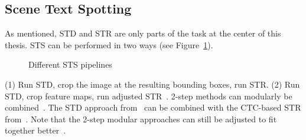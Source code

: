 \subsection{Scene Text Spotting}
As mentioned, \ac{STD} and \ac{STR} are only parts of the task at the center of this thesis.
\ac{STS} can be performed in two ways (see Figure~\ref{fig:e2e-pipelines}).

\begin{figure}[ht]
    \centering
    
    \caption{Different STS pipelines\label{fig:e2e-pipelines}}
\end{figure}
(1) Run \ac{STD}, crop the image at the resulting bounding boxes, run \ac{STR}.
(2) Run \ac{STD}, crop feature maps, run adjusted \ac{STR}~\citep{chen_text_2021,long_scene_2021}.
2-step methods can modularly be combined~\citep{liao_textboxes_2017,shi_aster_2019}.
The \ac{STD} approach from~\cite{liao_textboxes_2017} can be combined with the CTC-based \ac{STR}
from~\cite{shi_end--end_2017}.
Note that the 2-step modular approaches can still be adjusted to fit together
better~\citep{liao_textboxes_2017}.

